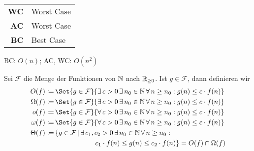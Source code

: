 \documentclass{cheat-sheet}
\begin{document}

\newtheorem*{definition}{Definition}

\begin{abk}
  \begin{tabular}{r l}
    \textbf{WC} & Worst Case \\
    \textbf{AC} & Worst Case \\
    \textbf{BC} & Best Case
  \end{tabular}
\end{abk}

\begin{alg}
  BC: $O(n)$; AC, WC: $O(n^2)$
\end{alg}

\begin{nota}
  Sei $\mathcal{F}$ die Menge der Funktionen von $\mathbb{N}$ nach $\mathbb{R}_{\geq 0}$. Ist $g \in \mathcal{F}$, dann definieren wir
  \begin{align*}
    O(f) \coloneqq& \, \Set{ g \in \mathcal{F} }{ \exists\,c > 0\,\exists\,n_0 \in \N\,\forall\,n \geq n_0 : g(n) \leq c \cdot f(n) } \\
    \Omega(f) \coloneqq& \, \Set{ g \in \mathcal{F} }{ \exists\,c > 0\,\exists\,n_0 \in \N\,\forall\,n \geq n_0 : g(n) \leq c \cdot f(n) } \\
    o(f) \coloneqq& \, \Set{ g \in \mathcal{F} }{ \forall\,c > 0\,\exists\,n_0 \in \N\,\forall\,n \geq n_0 : g(n) \leq c \cdot f(n) } \\
    \omega(f) \coloneqq& \, \Set{ g \in \mathcal{F} }{ \forall\,c > 0\,\exists\,n_0 \in \N\,\forall\,n \geq n_0 : g(n) \leq c \cdot f(n) } \\
    \Theta(f) \coloneqq& \, \{ g \in \mathcal{F} \,|\, \exists\,c_1, c_2 > 0\,\exists\,n_0 \in \N\,\forall\,n \geq n_0 : \\
    & \qquad \qquad \qquad c_1 \cdot f(n) \leq g(n) \leq c_2 \cdot f(n) \}
              = O(f) \cap \Omega(f) \\
  \end{align*}
\end{nota}
\end{document}
